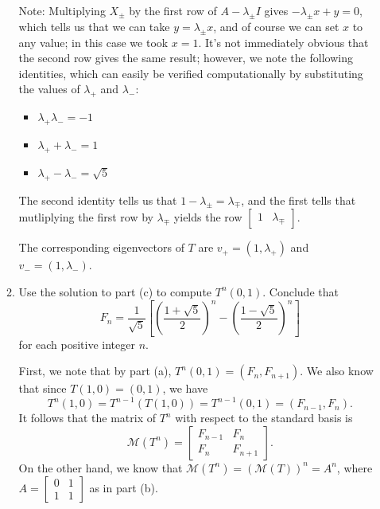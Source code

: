 \documentclass[letterpaper,12pt]{article}
\begin{document}
\begin{enumerate}
\begin{enumerate}
Note: Multiplying $X_\pm$ by the first row of $A-\lambda_\pm I$ gives $-\lambda_\pm x+y = 0$, which tells us that we can take $y=\lambda_\pm x$, and of course we can set $x$ to any value; in this case we took $x=1$. It's not immediately obvious that the second row gives the same result; however, we note the following identities, which can easily be verified computationally by substituting the values of $\lambda_+$ and $\lambda_-$:
\begin{itemize}
 \item $\lambda_+\lambda_- = -1$
 \item $\lambda_+ +\lambda_- = 1$
 \item $\lambda_+-\lambda_- = \sqrt{5}$
\end{itemize}
The second identity tells us that $1-\lambda_\pm = \lambda_\mp$, and the first tells that mutliplying the first row by $\lambda_\mp$ yields the row $\begin{bmatrix}1&\lambda_\mp\end{bmatrix}$.

The corresponding eigenvectors of $T$ are $v_+=(1,\lambda_+)$ and $v_-=(1,\lambda_-)$.

\bigskip

 \item Use the solution to part (c) to compute $T^n(0,1)$. Conclude that
 \[
 F_n = \frac{1}{\sqrt{5}}\left[\left(\frac{1+\sqrt{5}}{2}\right)^n-\left(\frac{1-\sqrt{5}}{2}\right)^n\right]
 \]
 for each positive integer $n$.

\bigskip

First, we note that by part (a), $T^n(0,1) = (F_n,F_{n+1})$. We also know that since $T(1,0)=(0,1)$, we have
\[
 T^n(1,0) = T^{n-1}(T(1,0))=T^{n-1}(0,1) = (F_{n-1},F_n).
\]
It follows that the matrix of $T^n$ with respect to the standard basis is
\[
 \mathcal{M}(T^n) = \begin{bmatrix}F_{n-1}&F_n\\F_n&F_{n+1}\end{bmatrix}.
\]
On the other hand, we know that $\mathcal{M}(T^n) = (\mathcal{M}(T))^n=A^n$, where $A=\begin{bmatrix}0&1\\1&1\end{bmatrix}$ as in part (b).


\end{enumerate}
\end{enumerate}
\end{document}
